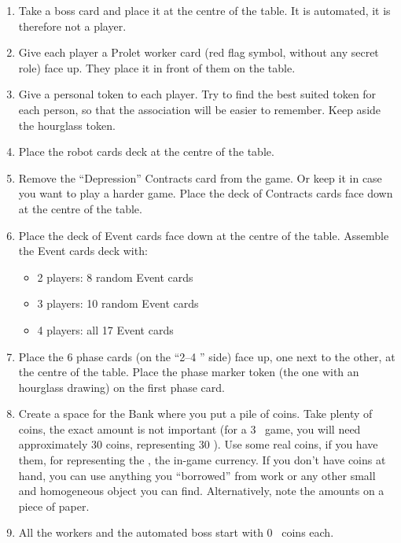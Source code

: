     \begin{enumerate}
        \item Take a boss card and place it at the centre of the table. It is automated, it is
        therefore not a player.
        \item Give each player a Prolet worker card (red flag symbol, without any secret
        role) face up. They place it in front of them on the table.
        \item Give a personal token to each player. Try to find the best suited token for
        each person, so that the association will be easier to remember. Keep aside
        the hourglass token.
        \item Place the robot cards deck at the centre of the table.
        \item Remove the “Depression” Contracts card from the game. Or keep it in case
        you want to play a harder game. Place the deck of Contracts cards face
        down at the centre of the table.
        \item Place the deck of Event cards face down at the centre of the table. Assemble
        the Event cards deck with:
        \begin{itemize}
            \item 2 players: 8 random Event cards
            \item 3 players: 10 random Event cards
            \item 4 players: all 17 Event cards
        \end{itemize}
        \item Place the 6 phase cards (on the “2–4 \faPeopleGroup” side) face up, one next to the other,
        at the centre of the table. Place the phase marker token (the one with an
        hourglass drawing) on the first phase card.
        \item Create a space for the Bank where you put a pile of coins. Take plenty of
        coins, the exact amount is not important (for a 3 \faPeopleGroup\ game, you will need approximately
        30 coins, representing 30 \faRubleSign). Use some real coins, if you have
        them, for representing the \faRubleSign, the in-game currency. If you don't have coins
        at hand, you can use anything you “borrowed” from work or any other small
        and homogeneous object you can find. Alternatively, note the amounts on
        a piece of paper.
        \item All the workers and the automated boss start with 0 \faRubleSign\ coins each.
    \end{enumerate}



